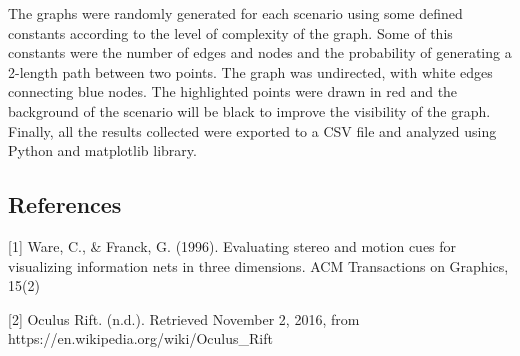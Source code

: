 The graphs were randomly generated for each scenario using some defined
constants according to the level of complexity of the graph. Some of
this constants were the number of edges and nodes and the probability of
generating a 2-length path between two points. The graph was undirected,
with white edges connecting blue nodes. The highlighted points were
drawn in red and the background of the scenario will be black to improve
the visibility of the graph. Finally, all the results collected were
exported to a CSV file and analyzed using Python and matplotlib library.

\subsection{References}\label{references}

{[}1{]} Ware, C., \& Franck, G. (1996). Evaluating stereo and motion
cues for visualizing information nets in three dimensions. ACM
Transactions on Graphics, 15(2)

{[}2{]} Oculus Rift. (n.d.). Retrieved November 2, 2016, from
https://en.wikipedia.org/wiki/Oculus\_Rift

